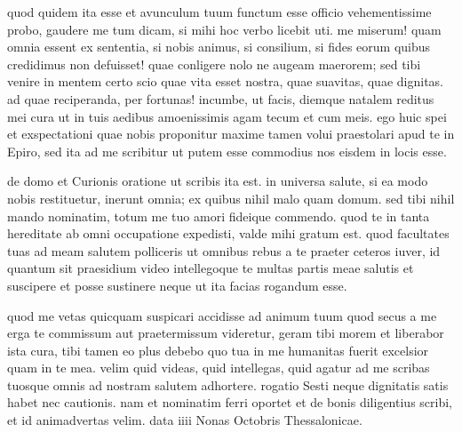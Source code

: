 


 quod quidem ita esse et avunculum tuum functum esse officio vehementissime probo, gaudere me tum dicam, si mihi hoc verbo licebit uti. me miserum! quam omnia essent ex sententia, si nobis animus, si consilium, si fides eorum quibus credidimus non defuisset! quae conligere nolo ne augeam maerorem; sed tibi venire in mentem certo scio quae vita esset nostra, quae suavitas, quae dignitas. ad quae reciperanda, per fortunas! incumbe, ut facis, diemque natalem reditus mei cura ut in tuis aedibus amoenissimis agam tecum et cum meis. ego huic spei et exspectationi quae nobis proponitur maxime tamen volui praestolari apud te in Epiro, sed ita ad me scribitur ut putem esse commodius nos eisdem in locis esse.

 de domo et Curionis oratione ut scribis ita est. in universa salute, si ea modo nobis restituetur, inerunt omnia; ex quibus nihil malo quam domum. sed tibi nihil mando nominatim, totum me tuo amori fideique commendo. quod te in tanta hereditate ab omni occupatione expedisti, valde mihi gratum est. quod facultates tuas ad meam salutem polliceris ut omnibus rebus a te praeter ceteros iuver, id quantum sit praesidium video intellegoque te multas partis meae salutis et suscipere et posse sustinere neque ut ita facias rogandum esse.

 quod me vetas quicquam suspicari accidisse ad animum tuum quod secus a me erga te commissum aut praetermissum videretur, geram tibi morem et liberabor ista cura, tibi tamen eo plus debebo quo tua in me humanitas fuerit excelsior quam in te mea. velim quid videas, quid intellegas, quid agatur ad me scribas tuosque omnis ad nostram salutem adhortere. rogatio Sesti neque dignitatis satis habet nec cautionis. nam et nominatim ferri oportet et de bonis diligentius scribi, et id animadvertas velim. data iiii Nonas Octobris Thessalonicae.
